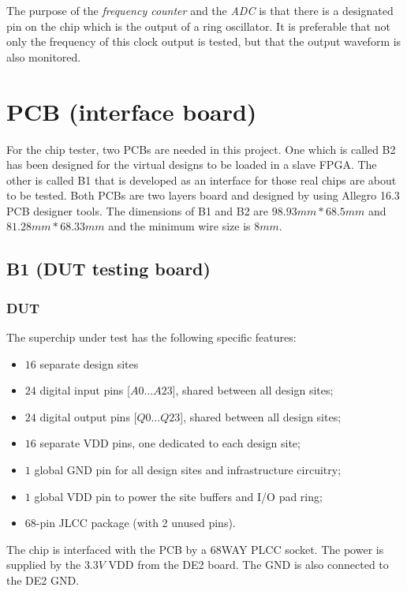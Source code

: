The purpose of the \textit{frequency counter} and the \textit{ADC} is that there is a designated pin on the chip which is the output of a ring oscillator. It is preferable that not only the frequency of this clock output is tested, but that the output waveform is also monitored.


\section{PCB (interface board)}

For the chip tester, two PCBs are needed in this project. One which is called B2 has been designed for the virtual designs to be loaded in a slave FPGA. The other is called B1 that is developed as an interface for those real chips are about to be tested. Both PCBs are two layers board and designed by using Allegro 16.3 PCB designer tools. The dimensions of B1 and B2 are $98.93 mm* 68.5 mm$ and $81.28 mm * 68.33 mm$ and the minimum wire size is $8mm$.

\subsection{B1 (DUT testing board)}

\subsubsection{DUT}

The superchip under test has the following specific features:
\begin{itemize}
 \item $16$ separate design sites
 \item $24$ digital input pins [$A0\dots A23$], shared between all design sites;
 \item $24$ digital output pins [$Q0\dots Q23$], shared between all design sites;
 \item $16$ separate VDD pins, one dedicated to each design site;
 \item $1$ global GND pin for all design sites and infrastructure circuitry;
 \item $1$ global VDD pin to power the site buffers and I/O pad ring;
 \item $68$-pin JLCC package (with 2 unused pins).
\end{itemize}

The chip is interfaced with the PCB by a 68WAY PLCC socket. The power is supplied by the $3.3V$ VDD from the DE2 board. The GND is also connected to the DE2 GND.

